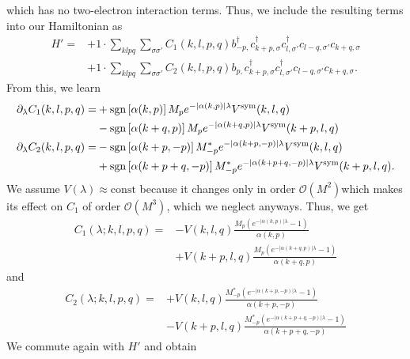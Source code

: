 which has no two-electron interaction terms. Thus, we include the resulting terms into our Hamiltonian as 
\begin{align*}
	H'= 	&+1 \cdot \sum_{ k l p q } \sum_{ \sigma \sigma' } C_1( k, l, p, q )   b_{ -p, }^\dagger  c_{ k+p, \sigma }^\dagger  c_{ l, \sigma' }^\dagger  c_{ l-q, \sigma' } c_{ k+q, \sigma }  \\
	&+1 \cdot \sum_{ k l p q } \sum_{ \sigma \sigma' } C_2( k, l, p, q )   b_{ p, } c_{ k+p, \sigma }^\dagger  c_{ l, \sigma' }^\dagger  c_{ l-q, \sigma' } c_{ k+q, \sigma } 
. \end{align*}
From this, we learn \begin{align*}
	\partial_\lambda C_1(k,l,p,q) =&+ \operatorname{sgn} \left[\alpha (k, p)\right] M_{p} e^{ - | \alpha (k,p) | \lambda } V^\mathrm{sym}( k, l, q ) \\
	&- \operatorname{sgn} \left[\alpha (k+q, p)\right] M_{p} e^{ - | \alpha (k+q,p) | \lambda } V^\mathrm{sym}( k+p, l, q ) \\
	\partial_\lambda C_2(k,l,p,q) =& -\operatorname{sgn} \left[ \alpha (k+p, -p) \right] M_{-p}^* e^{ - | \alpha (k+p,-p) | \lambda } V^\mathrm{sym}( k, l, q ) \\
	&+ \operatorname{sgn} \left[ \alpha (k+p+q, -p) \right] M_{-p}^* e^{ - | \alpha (k+p+q,-p) | \lambda } V^\mathrm{sym}( k+p, l, q ) . \end{align*}
We assume $V(\lambda) \approx \mathrm{const}$ because it changes only in order $\mathcal{O}(M^2)$which makes its effect on $C_1$ of order $\mathcal{O}(M^3)$, which we neglect anyways. Thus, we get \begin{align*}
	C_1(\lambda; k, l, p, q) =&- V(k, l, q) \frac{M_{p} \left(  e^{ - | \alpha (k,p) | \lambda } - 1 \right) }{\alpha (k, p)}\\
		& + V(k+p, l, q) \frac{M_{p} \left(  e^{ - | \alpha (k+q,p) | \lambda } - 1 \right)}{\alpha (k+q, p)}\end{align*}
and
\begin{align*}
	C_2(\lambda; k, l, p, q) =&+ V(k, l, q) \frac{M_{-p}^* \left(  e^{ - | \alpha (k+p,-p) | \lambda } - 1 \right)}{\alpha (k+p, -p)}\\
		& - V(k+p, l, q) \frac{M_{-p}^* \left(  e^{ - | \alpha (k+p+q,-p) | \lambda } - 1 \right)}{\alpha (k+p+q, -p)}\end{align*}
We commute again with $H'$ and obtain
